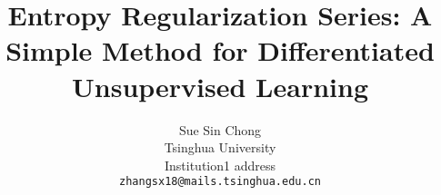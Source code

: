 \documentclass[10pt,twocolumn,letterpaper]{article}
\begin{document}
\title{Entropy Regularization Series: A Simple Method for Differentiated Unsupervised Learning}

\author{Sue Sin Chong\\
Tsinghua University\\
Institution1 address\\
{\tt\small zhangsx18@mails.tsinghua.edu.cn}

}

\maketitle
\ificcvfinal\thispagestyle{empty}\fi


\end{document}

